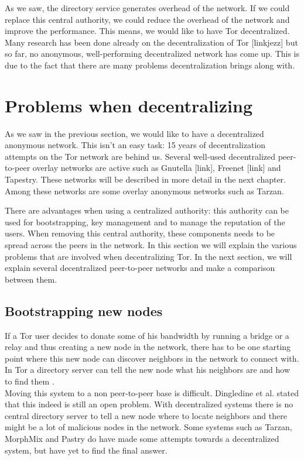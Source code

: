 \documentclass[journal]{IEEEtran}
\begin{document}
		As we saw, the directory service generates overhead of the network. If we could replace this central authority, we could reduce the overhead of the network and improve the performance. This means, we would like to have Tor decentralized. Many research has been done already on the decentralization of Tor [linkjezz] but so far, no anonymous, well-performing decentralized network has come up. This is due to the fact that there are many problems decentralization brings along with.

\section{Problems when decentralizing}
		As we saw in the previous section, we would like to have a decentralized anonymous network. This isn't an easy task: 15 years of decentralization attempts on the Tor network are behind us. Several well-used decentralized peer-to-peer overlay networks are active such as Gnutella [link], Freenet [link] and Tapestry. These networks will be described in more detail in the next chapter. Among these networks are some overlay anonymous networks such as Tarzan.

		There are advantages when using a centralized authority: this authority can be used for bootstrapping, key management and to manage the reputation of the users. When removing this central authority, these components needs to be spread across the peers in the network. In this section we will explain the various problems that are involved when decentralizing Tor. In the next section, we will explain several decentralized peer-to-peer networks and make a comparison between them.
		
			\subsection{Bootstrapping new nodes}
		If a Tor user decides to donate some of his bandwidth by running a bridge or a relay and thus creating a new node in the network, there has to be one starting point where this new node can discover neighbors in the network to connect with. In Tor a directory server can tell the new node what his neighbors are and how to find them \cite{dingledine2004tor}.\\
		
Moving this system to a non peer-to-peer base is difficult. Dingledine et al. stated that this indeed is still an open problem. With decentralized systems there is no central directory server to tell a new node where to locate neighbors and there might be a lot of malicious nodes in the network. Some systems such as Tarzan, MorphMix and Pastry \cite{rowstron2001pastry, rennhard2002introducing} do have made some attempts towards a decentralized system, but have yet to find the final answer.
\end{document}
